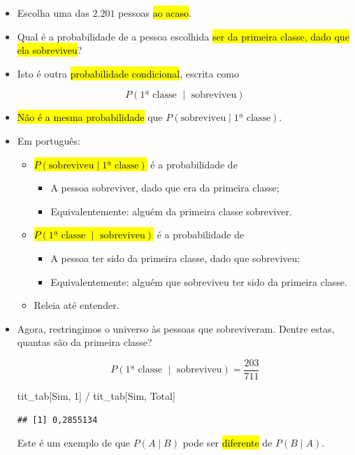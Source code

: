 \documentclass[
  11pt]{report}
\newenvironment{Shaded}{\begin{snugshade}}{\end{snugshade}}
\newcommand{\NormalTok}[1]{#1}
\newcommand{\SpecialCharTok}[1]{\textcolor[rgb]{0.00,0.00,0.00}{#1}}
\newcommand{\StringTok}[1]{\textcolor[rgb]{0.31,0.60,0.02}{#1}}
\renewenvironment{Shaded}{
    \begin{mdframed}[%
      roundcorner=2pt,%
      innerleftmargin=5pt,%
      innerrightmargin=5pt,%
      topline=true,%
      leftline=true,%
      rightline=true,%
      bottomline=true,%
      linewidth=0.5pt,%
      linecolor=black!20,%
      backgroundcolor=black!2,%
      skipabove=2ex,%
      skipbelow=2.5ex%
    ]%
  }
  {
    \end{mdframed}
  }
\begin{document}
\begin{itemize}
\item
  Escolha uma das $2.201$ pessoas {\hl{ao acaso}}.
\item
  Qual é a probabilidade de a pessoa escolhida {\hl{ser da primeira classe, dado que ela sobreviveu}}?
\item
  Isto é outra {\hl{probabilidade condicional}}, escrita como

  \[
  P(\text{1ª classe } \mid \text{ sobreviveu})
  \]
\item
  {\hl{Não é a mesma probabilidade}} que $P(\text{sobreviveu} \mid \text{1ª classe})$.
\item
  Em português:

  \begin{itemize}
  \item
    {\hl{$P(\text{sobreviveu} \mid \text{1ª classe})$}} é a probabilidade de

    \begin{itemize}
    \item
      A pessoa sobreviver, dado que era da primeira classe;
    \item
      Equivalentemente: alguém da primeira classe sobreviver.
    \end{itemize}
  \item
    {\hl{$P(\text{1ª classe } \mid \text{ sobreviveu})$}} é a probabilidade de

    \begin{itemize}
    \item
      A pessoa ter sido da primeira classe, dado que sobreviveu;
    \item
      Equivalentemente: alguém que sobreviveu ter sido da primeira classe.
    \end{itemize}
  \item
    Releia até entender.
  \end{itemize}
\item
  Agora, restringimos o universo às pessoas que sobreviveram. Dentre estas, quantas são da primeira classe?

  \[
  P(\text{1ª classe } \mid \text{ sobreviveu}) = 
  \frac
  {203}
  {711}
  \]

\begin{Shaded}
\begin{Highlighting}[]
\NormalTok{tit\_tab[}\StringTok{\textquotesingle{}Sim\textquotesingle{}}\NormalTok{, }\StringTok{\textquotesingle{}1\textquotesingle{}}\NormalTok{] }\SpecialCharTok{/}\NormalTok{ tit\_tab[}\StringTok{\textquotesingle{}Sim\textquotesingle{}}\NormalTok{, }\StringTok{\textquotesingle{}Total\textquotesingle{}}\NormalTok{]}
\end{Highlighting}
\end{Shaded}

\begin{verbatim}
## [1] 0,2855134
\end{verbatim}

  Este é um exemplo de que $P(A \mid B)$ pode ser {\hl{diferente}} de $P(B \mid A)$.
\end{itemize}
\end{document}
